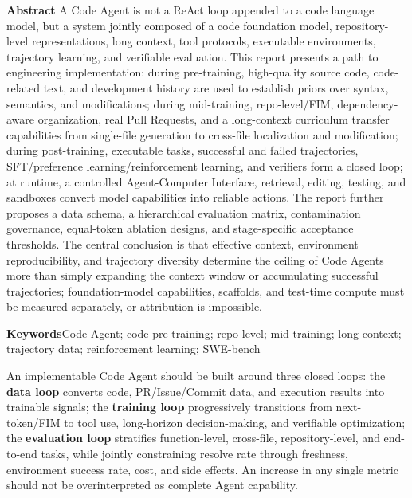 \documentclass[10pt,a4paper,UTF8,fontset=none]{ctexart}
\begin{document}
\noindent\textbf{Abstract}\quad
A Code Agent is not a ReAct loop appended to a code language model, but a system jointly composed of a code foundation model, repository-level representations, long context, tool protocols, executable environments, trajectory learning, and verifiable evaluation. This report presents a path to engineering implementation: during pre-training, high-quality source code, code-related text, and development history are used to establish priors over syntax, semantics, and modifications; during mid-training, repo-level/FIM, dependency-aware organization, real Pull Requests, and a long-context curriculum transfer capabilities from single-file generation to cross-file localization and modification; during post-training, executable tasks, successful and failed trajectories, SFT/preference learning/reinforcement learning, and verifiers form a closed loop; at runtime, a controlled Agent-Computer Interface, retrieval, editing, testing, and sandboxes convert model capabilities into reliable actions. The report further proposes a data schema, a hierarchical evaluation matrix, contamination governance, equal-token ablation designs, and stage-specific acceptance thresholds. The central conclusion is that effective context, environment reproducibility, and trajectory diversity determine the ceiling of Code Agents more than simply expanding the context window or accumulating successful trajectories; foundation-model capabilities, scaffolds, and test-time compute must be measured separately, or attribution is impossible.

\vspace{5pt}
\noindent\textbf{Keywords}\quad Code Agent; code pre-training; repo-level; mid-training; long context; trajectory data; reinforcement learning; SWE-bench

\begin{keybox}
An implementable Code Agent should be built around three closed loops: the \textbf{data loop} converts code, PR/Issue/Commit data, and execution results into trainable signals; the \textbf{training loop} progressively transitions from next-token/FIM to tool use, long-horizon decision-making, and verifiable optimization; the \textbf{evaluation loop} stratifies function-level, cross-file, repository-level, and end-to-end tasks, while jointly constraining resolve rate through freshness, environment success rate, cost, and side effects. An increase in any single metric should not be overinterpreted as complete Agent capability.
\end{keybox}
\end{document}
